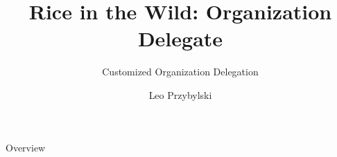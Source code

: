 \documentclass[xcolor=dvipsnames,14pt]{beamer}
\begin{document}
\title[A short proof]{Rice in the Wild: Organization Delegate}
\subtitle[Errors]{Customized Organization Delegation}
\author[Leo]{Leo Przybylski}



\begin{frame}[plain]
  \titlepage
\end{frame}

\begin{frame}{Overview}
\end{frame}
\end{document}
